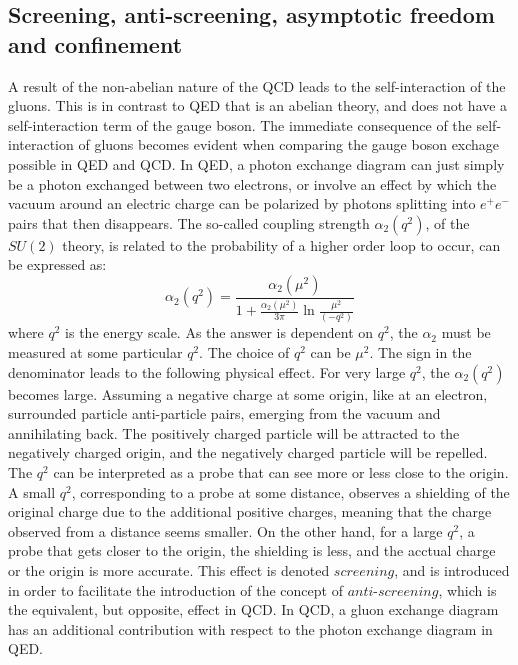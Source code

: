 \subsection*{Screening, anti-screening, asymptotic freedom and confinement}\label{sec:alpha} 
\noindent\justify
A result of the non-abelian nature of the QCD leads to the self-interaction of the gluons.
This is in contrast to QED that is an abelian theory, and does not have a self-interaction term of the gauge boson. 
The immediate consequence of the self-interaction of gluons becomes evident when comparing the gauge boson exchage possible in QED and QCD. 
In QED, a photon exchange diagram can just simply be a photon exchanged between two electrons, or involve an effect by which the vacuum around an electric charge can be polarized by photons splitting into $e^{+}e^{-}$ pairs that then disappears. 
The so-called coupling strength $\alpha_{2}(q^{2})$, of the $SU(2)$ theory, is related to the probability of a higher order loop to occur, can be expressed as:  
\begin{equation}
\alpha_{2}(q^{2})=\frac{\alpha_{2}(\mu^{2})}{1+\frac{\alpha_{2}(\mu^{2})}{3\pi}\ln\frac{\mu^{2}}{(-q^{2})}}
\label{eq:QEDalpha}
\end{equation}
where $q^{2}$ is the energy scale. 
As the answer is dependent on $q^{2}$, the $\alpha_{2}$ must be measured at some particular $q^{2}$. The choice of $q^{2}$ can be $\mu^{2}$.
The sign in the denominator leads to the following physical effect. 
For very large $q^{2}$, the $\alpha_{2}(q^{2})$ becomes large. 
Assuming a negative charge at some origin, like at an electron, surrounded particle anti-particle pairs, emerging from the vacuum and annihilating back. 
The positively charged particle will be attracted to the negatively charged origin, and the negatively charged particle will be repelled.   
The $q^{2}$ can be interpreted as a probe that can see more or less close to the origin. 
A small $q^{2}$, corresponding to a probe at some distance, observes a shielding of the original charge due to the additional positive charges, meaning that the charge observed from a distance seems smaller. 
On the other hand, for a large $q^{2}$, a probe that gets closer to the origin, the shielding is less, and the acctual charge or the origin is more accurate. 
This effect is denoted $screening$, and is introduced in order to facilitate the introduction of the concept of $anti$-$screening$, which is the equivalent, but opposite, effect in QCD.
\newpara
\noindent\justify
In QCD, a gluon exchange diagram has an additional contribution with respect to the photon exchange diagram in QED. 
